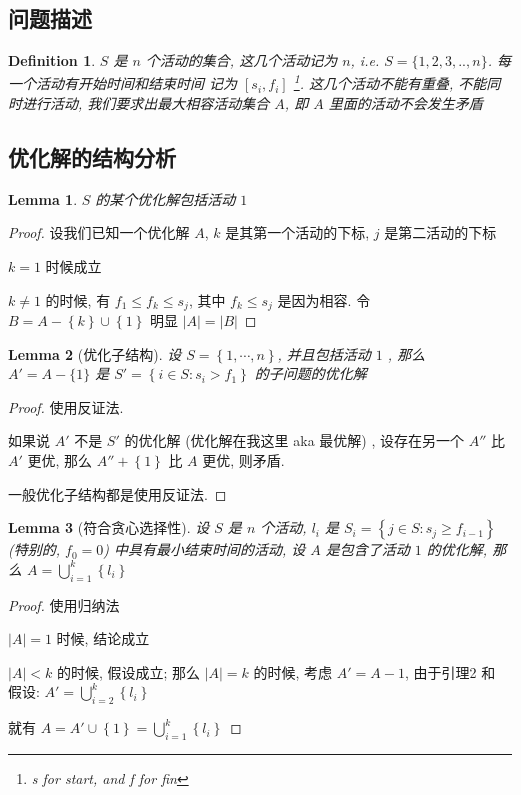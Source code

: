 \documentclass[a4paper, 10pt]{ctexart} %
\newtheorem{definition}{Definition}
\newtheorem{lemma}{Lemma}
\begin{document}
\subsection{问题描述}
\begin{definition}
    $S$ 是 $n$ 个活动的集合, 这几个活动记为 $n$, i.e. $S = \{ 1,2,3,.. , n \}$. 
    每一个活动有开始时间和结束时间 记为 $\left[ s_i , f_i\right]$ \footnote{s for start, and f for fin}. 这几个活动不能有重叠,
    不能同时进行活动, 我们要求出最大相容活动集合 $A$, 即 $A$ 里面的活动不会发生矛盾
\end{definition}
\subsection{优化解的结构分析}
\begin{lemma}
    $S$ 的某个优化解包括活动 $1$
\end{lemma}
\begin{proof}
    设我们已知一个优化解 $A$, $k$ 是其第一个活动的下标, $j$ 是第二活动的下标

    $k=1$ 时候成立

    $k \ne 1$ 的时候, 有 $f_1 \le f_k \le s_j$, 其中 $f_k\le s_j$ 是因为相容.
    令 $B = A - \left\{ k\right\} \cup \left\{1\right\}$ 明显 $\left|  A \right|  =\left| B \right| $
\end{proof}
\begin{lemma}[优化子结构]
    设 $S = \left\{ 1, \cdots  ,n   \right\}$,
    并且包括活动 $1$ , 那么 $A ' = A - \{1\}$ 是 $S ' = \left\{ i \in S: s_i > f_1\right\}$ 的子问题的优化解
\end{lemma}
\begin{proof}
    使用反证法.

    如果说 $A'$ 不是 $S'$ 的优化解 (优化解在我这里 aka 最优解) , 设存在另一个 $A''$ 比 $A'$ 更优, 那么
    $A'' + \left\{1\right\}$ 比 $A$ 更优, 则矛盾. 

    一般优化子结构都是使用反证法.
\end{proof}
\begin{lemma}[符合贪心选择性]
    设 $S$ 是 $n$ 个活动, $l_i$ 是 $S_i = \left\{j \in S: s_j \ge f_{i-1}\right\}$ (特别的, $f_0 = 0$) 中具有最小结束时间的活动, 设 $A$ 是包含了活动 $1$ 的优化解, 那么 $A =\bigcup ^{k}_{i=1}\left\{ l_i\right\}$
\end{lemma}
\begin{proof}
    使用归纳法

    $\left| A \right| = 1 $ 时候, 结论成立

    $\left|  A \right|  < k$ 的时候, 假设成立; 那么 $\left| A \right|  =k $ 的时候, 考虑 $A' = A -{1}$, 由于引理2 和 假设: $A' = \bigcup _{i=2}^{k}\left\{ l_i\right\}$

    就有 $A = A'\cup \left\{1\right\} = \bigcup _{i=1}^{k} \left\{l_i    \right\}$
\end{proof}
\end{document}
